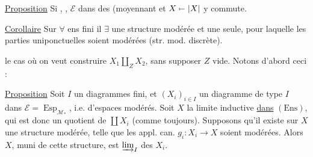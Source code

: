\uline{Proposition} Si , ,  $\mathcal E$
 dans des
 (moyennant  et $X\mathrel{\mapstochar\relbar}|X|$ y commute.

\uline{Corollaire} Sur $\forall$ ens fini il $\exists$ une structure modérée et une seule, pour laquelle les parties uniponctuelles soient modérées (str. mod. discrète).

 le cas où on veut construire $X_1\amalg_Z X_2$, sans supposer $Z$ vide. Notons d'abord ceci :

\uline{Proposition} Soit $I$ un   diagrammes fini, et $(X_i)_{i\in I}$ un diagramme de type $I$ dans $\mathcal E=\operatorname{Esp}_{\mathcal M_*}$, i.e. d'espaces modérés. Soit $X$ la limite inductive \uline{dans} $(\mathrm{Ens})$, qui est donc un  quotient de $\coprod X_i$ (comme toujours). Supposons qu'il existe sur $X$ une structure modérée, telle que les appl. can. $g_i:X_i\longrightarrow X$ soient modérées. Alors $X$, muni de cette structure, est  $\varinjlim_I$ des $X_i$.
